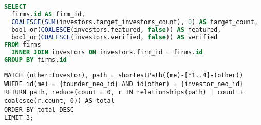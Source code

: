 \newpage

\begin{lstlisting}[frame=single,language=SQL,basicstyle=\footnotesize,columns=fullflexible,label={vcwiz:sql:view},caption={Denormalization of Individual Investor Properties}]
SELECT
  firms.id AS firm_id,
  COALESCE(SUM(investors.target_investors_count), 0) AS target_count,
  bool_or(COALESCE(investors.featured, false)) AS featured,
  bool_or(COALESCE(investors.verified, false)) AS verified
FROM firms
  INNER JOIN investors ON investors.firm_id = firms.id
GROUP BY firms.id
\end{lstlisting}

\begin{lstlisting}[frame=single,basicstyle=\footnotesize,columns=fullflexible,caption={Intro Paths},label={vcwiz:cypher:intro}]
MATCH (other:Investor), path = shortestPath((me)-[*1..4]-(other))
WHERE id(me) = {founder_neo_id} AND id(other) = {investor_neo_id}
RETURN path, reduce(count = 0, r IN relationships(path) | count + coalesce(r.count, 0)) AS total
ORDER BY total DESC
LIMIT 3;
\end{lstlisting}

\clearpage
\newpage
